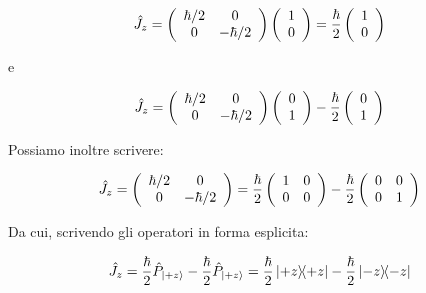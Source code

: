 	\begin{equation}
		\hat{J}_z = 
		\left( \begin{array}{c c}
				\hbar / 2 & 0 \\
				0 &  - \hbar / 2 \\ 
			\end{array}
		\right )
		\left( \begin{array}{c}
				1 \\
				0 \\
			\end{array}
		\right ) = \frac{\hbar}{2} \left( \begin{array}{c}
				1 \\
				0 \\
			\end{array}
		\right )
	\end{equation}

e

	\begin{equation}
		\hat{J}_z = 
		\left( \begin{array}{c c}
				\hbar / 2 & 0 \\
				0 &  - \hbar / 2 \\ 
			\end{array}
		\right )
		\left( \begin{array}{c}
				0 \\
				1 \\
			\end{array}
		\right ) -\frac{\hbar}{2} \left( \begin{array}{c}
				0 \\
				1 \\
			\end{array}
		\right ) 
	\end{equation}

Possiamo inoltre scrivere:

	\begin{equation}
		\hat{J}_z = 
		\left( \begin{array}{c c}
				\hbar / 2 & 0 \\
				0 &  - \hbar / 2 \\ 
			\end{array}
		\right ) =
		\frac{\hbar}{2}
		\left( \begin{array}{c c}
				1 & 0 \\
				0 & 0 \\ 
			\end{array}
		\right ) -
		\frac{\hbar}{2}
		\left( \begin{array}{c c}
				0 & 0 \\
				0 & 1 \\ 
			\end{array}
		\right )
	\end{equation}

Da cui, scrivendo gli operatori in forma esplicita:

	\begin{equation}
		\hat{J}_z = \frac{\hbar}{2} \hat{P}_{\ket{+z}} - \frac{\hbar}{2} \hat{P}_{\ket{+z}} = \frac{\hbar}{2} \ketbra{+z}{+z} - \frac{\hbar}{2} \ketbra{-z}{-z}
	\end{equation}
